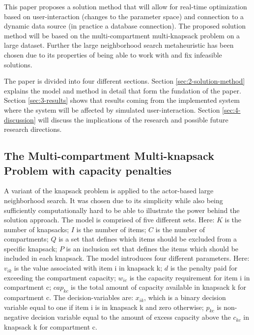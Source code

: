 \documentclass[preprint,12pt,authoryear]{elsarticle}
\begin{document}
This paper proposes a solution method that will allow for real-time optimization based on user-interaction (changes to the parameter space) and connection to a dynamic 
data source (in practice a database connection). The proposed solution method will be based on the multi-compartment multi-knapsack problem on a large dataset. 
Further the large neighborhood search metaheuristic has been chosen due to its properties of being able to work with and fix infeasible solutions. 

The paper is divided into four different sections. Section \ref{sec:2-solution-method} explains the model and method in detail that form the fundation of the paper. 
Section \ref{sec:3-results} shows that results coming from the implemented system where the system will be affected by simulated user-interaction. Section \ref{sec:4-discussion} 
will discuss the implications of the research and possible future research directions.

\subsection{The Multi-compartment Multi-knapsack Problem with capacity penalties}
\label{sub1sec2}
A variant of the knapsack problem is applied to the actor-based large neighborhood search. It was chosen due to its simplicity
while also being sufficiently computationally hard to be able to illustrate the power behind the solution approach. The model is comprised of 
five different sets. Here: $K$ is the number of knapsacks; $I$ is the number of items; $C$ is the number of compartments; $Q$ is a set that
defines which items should be excluded from a specific knapsack; $P$ is an inclusion set that defines the items which should be included in each 
knapsack. The model introduces four different parameters. Here: $v_{ik}$ is the value associated with item i in knapsack k; $d$ is the 
penalty paid for exceeding the compartment capacity; $w_{ic}$ is the capacity requirement for item i in compartment c; $cap_{kc}$ is the total amount 
of capacity available in knapsack k for compartment c. The decision-variables are: $x_{ik}$, which is a binary decision variable equal to one 
if item i is in knapsack k and zero otherwise; $p_{kc}$ is non-negative decision variable equal to the amount of excess capacity above 
the $c_{kc}$ in knapsack k for compartment c. 
\end{document}
